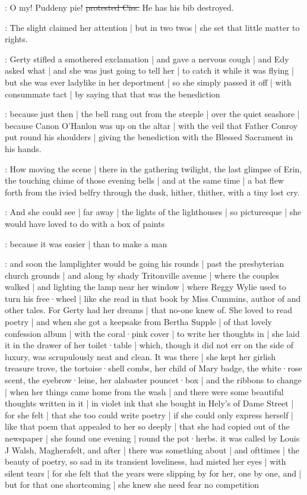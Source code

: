 \cissy:
O my!
Puddeny pie!
\sout{protested Ciss.}
He has his bib destroyed.

:
The slight 
claimed her attention |
but in two twos |
she set that little matter to rights.

\gertyReal:
Gerty stifled a smothered exclamation |
and gave a nervous cough |
and Edy asked what |
and she was just going to tell her |
to catch it while it was flying |
but she was ever ladylike in her deportment |
so she simply passed it off |
with consummate tact |
by saying that that was the benediction

\Nrelig:
because just then |
the bell rang out from the steeple |%
over the quiet seashore |
because Canon O'Hanlon
was up on the altar |
with the veil
that Father Conroy put round his shoulders |
giving the benediction
with the Blessed Sacrament in his hands.

:
How moving the scene |
there in the gathering twilight,
the last glimpse of Erin,
the touching chime of those evening bells |
and at the same time |
a bat
flew forth from the ivied belfry through the dusk,
hither,
thither,
with a tiny lost cry.

\gertyNovel:
And she could see |
far away |
the lights of the lighthouses |
so picturesque |
she would have loved to do with a box of paints

\gertyReal:
because it was easier |
than to make a man

\gertyNovel:
and soon the lamplighter would be going his rounds |
past the presbyterian church grounds |%
and along by shady Tritonville avenue |
where the couples walked |
and lighting the lamp near her window |
where Reggy Wylie used to turn his free·wheel |
like she read in that book
 by Miss Cummins,
author of  and other tales.
For Gerty had her dreams |
that no-one knew of.
She loved to read poetry |
and when she got a keepsake from Bertha Supple |
of that lovely confession album |
with the coral·pink cover |
to write her thoughts in |
she laid it in the drawer of her toilet·table |
which,
though it did not err on the side of luxury,
was scrupulously neat and clean.
It was there |
she kept her girlish treasure trove,
the tortoise·shell combs,
her child of Mary badge,
the white·rose scent,
the eyebrow·leine,%
her alabaster pouncet·box |
and the ribbons to change |
when her things came home from the wash |
and there were
some beautiful thoughts written in it |
in violet ink that she bought in Hely's of Dame Street |
for she felt |
that she too could write poetry |
if she could only express herself |
like that poem that appealed to her so deeply |
that she had copied out of the newspaper |
she found one evening |
round the pot·herbs.
it was called by Louis J Walsh,
Magherafelt,
and after |
there was something about
 |
and ofttimes |
the beauty of poetry,
so sad in its transient loveliness,
had misted her eyes |
with silent tears |
for she felt
that the years were slipping by for her,
one by one,
and |
but for that one shortcoming |%
she knew she need fear no competition

